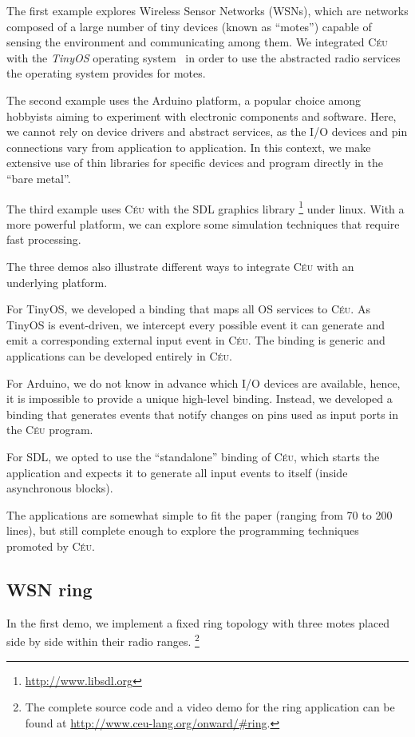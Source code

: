 \documentclass{sigplan-proc}
\newcommand{\2}{\;\;}
\newcommand{\5}{\;\;\;\;\;}
\newcommand{\CEU}{\textsc{C\'{e}u}}
\begin{document}
The first example explores Wireless Sensor Networks (WSNs), which are networks 
composed of a large number of tiny devices (known as ``motes'') capable of 
sensing the environment and communicating among them.
We integrated \CEU{} with the \emph{TinyOS} operating system~\cite{wsn.tos} in 
order to use the abstracted radio services the operating system provides for 
motes.

The second example uses the Arduino platform, a popular choice among hobbyists 
aiming to experiment with electronic components and software.
Here, we cannot rely on device drivers and abstract services, as the I/O 
devices and pin connections vary from application to application.
In this context, we make extensive use of thin libraries for specific devices 
and program directly in the ``bare metal''.

The third example uses \CEU{} with the SDL graphics library%
\footnote{\url{http://www.libsdl.org}} under linux.
With a more powerful platform, we can explore some simulation techniques that 
require fast processing.

The three demos also illustrate different ways to integrate \CEU{} with an 
underlying platform.

For TinyOS, we developed a binding that maps all OS services to \CEU.
As TinyOS is event-driven, we intercept every possible event it can generate 
and emit a corresponding external input event in \CEU.
The binding is generic and applications can be developed entirely in \CEU.

For Arduino, we do not know in advance which I/O devices are available, hence, 
it is impossible to provide a unique high-level binding.
Instead, we developed a binding that generates events that notify changes on 
pins used as input ports in the \CEU{} program.

For SDL, we opted to use the ``standalone'' binding of \CEU{}, which starts the 
application and expects it to generate all input events to itself (inside 
asynchronous blocks).

The applications are somewhat simple to fit the paper (ranging from 70 to 200 
lines), but still complete enough to explore the programming techniques 
promoted by \CEU{}.

\subsection{WSN ring}
\label{sec:demos:ring}

In the first demo, we implement a fixed ring topology with three motes placed 
side by side within their radio ranges.%
\footnote{The complete source code and a video demo for the ring application 
can be found at \url{http://www.ceu-lang.org/onward/\#ring}.}
\end{document}
